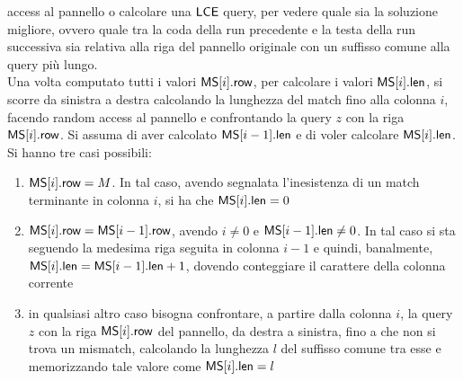 access al pannello o calcolare una $\mbox{\rm {\sf LCE}}$ query, per vedere quale sia la
soluzione migliore, ovvero quale tra la coda della run precedente e la testa
della run successiva sia relativa alla riga del pannello originale con un
suffisso comune alla query più lungo.\\
Una volta computato tutti i valori $\mbox{\rm {\sf MS}}[i].\mbox{\rm {\sf row}}$, per calcolare i valori
$\mbox{\rm {\sf MS}}[i].\mbox{\rm {\sf len}}$,
si scorre da sinistra a destra calcolando la lunghezza del match fino alla
colonna $i$, facendo random
access al pannello e confrontando la query $z$ con la riga $\mbox{\rm {\sf MS}}[i].\mbox{\rm {\sf row}}$. Si
assuma di aver calcolato $\mbox{\rm {\sf MS}}[i-1].\mbox{\rm {\sf len}}$ e di voler calcolare
$\mbox{\rm {\sf MS}}[i].\mbox{\rm {\sf len}}$. 
Si hanno tre casi possibili:
\begin{enumerate}
  \item $\mbox{\rm {\sf MS}}[i].\mbox{\rm {\sf row}}=M$. In tal caso, avendo segnalata l'inesistenza di un
  match terminante in colonna $i$, si ha che $\mbox{\rm {\sf MS}}[i].\mbox{\rm {\sf len}}=0$
  \item $\mbox{\rm {\sf MS}}[i].\mbox{\rm {\sf row}}=\mbox{\rm {\sf MS}}[i-1].\mbox{\rm {\sf row}}$, avendo $i\neq 0$ e $\mbox{\rm {\sf MS}}[i-1].\mbox{\rm {\sf len}}\neq 0$.
  In tal caso
  si sta seguendo la medesima riga seguita in colonna $i-1$ e quindi,
  banalmente, $\mbox{\rm {\sf MS}}[i].\mbox{\rm {\sf len}}=\mbox{\rm {\sf MS}}[i-1].\mbox{\rm {\sf len}}+1$, dovendo conteggiare il carattere
  della colonna corrente
  \item in qualsiasi altro caso bisogna confrontare, a partire dalla colonna
  $i$, la query 
  $z$ con la riga $\mbox{\rm {\sf MS}}[i].\mbox{\rm {\sf row}}$ del pannello, da destra a sinistra, fino a che
  non si trova un mismatch, calcolando la lunghezza $l$ del suffisso comune tra
  esse e memorizzando tale valore come $\mbox{\rm {\sf MS}}[i].\mbox{\rm {\sf len}}=l$
\end{enumerate}
